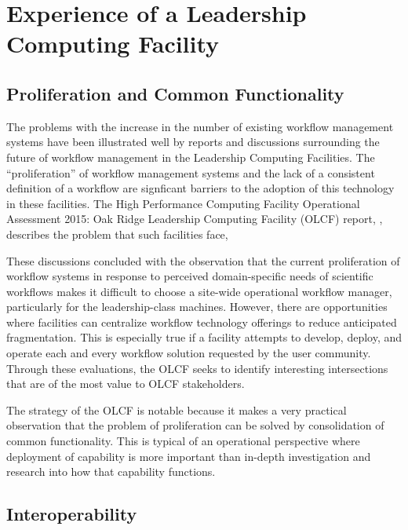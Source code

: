 \section{Experience of a Leadership Computing Facility}\label{olcf}

\subsection{Proliferation and Common Functionality} \label{commonFunc}

The problems with the increase in the number of existing workflow management
systems have been illustrated well by reports and discussions surrounding the
future of workflow management in the Leadership Computing Facilities. The
``proliferation'' of workflow management systems and the lack of a consistent
definition of a workflow are signficant barriers to the adoption of this
technology in these facilities. The High Performance Computing Facility
Operational Assessment 2015: Oak Ridge Leadership Computing Facility (OLCF)
report, \cite{barker_scientific_2007}, describes the problem that such
facilities face,  \begin{displayquote} These discussions concluded with the
observation that the current proliferation of workflow systems in response to
perceived domain-specific needs of scientific workflows makes it difficult to
choose a site-wide operational workflow manager, particularly for the
leadership-class machines. However, there are opportunities where facilities
can centralize workflow technology offerings to reduce anticipated
fragmentation. This is especially true if a facility attempts to develop,
deploy, and operate each and every workflow solution requested by the user
community. Through these evaluations, the OLCF seeks to identify interesting
intersections that are of the most value to OLCF stakeholders.
\end{displayquote}  The strategy of the OLCF is notable because it makes a
very practical observation that the problem of proliferation can be solved by
consolidation of common functionality. This is typical of an operational
perspective where deployment of capability is more important than in-depth
investigation and research into how that capability functions.

\subsection{Interoperability}\label{interop}


